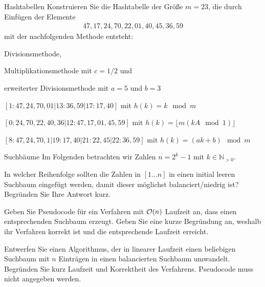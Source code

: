 \documentclass{article}
\begin{document}
\begin{eexercises}{Hashtabellen}{
    Konstruieren Sie die Hashtabelle der Größe $m = 23$, die durch Einfügen der Elemente
    \begin{align*}47, 17, 24, 70, 22, 01, 40, 45, 36, 59\end{align*}
    mit der nachfolgenden Methode entsteht:
  }
  \item Divisionsmethode,
  \item Multiplikationsmethode mit $c = 1/2$ und
  \item erweiterter Divisionsmethode mit $a = 5$ und $b = 3$
\end{eexercises}

\begin{solutions}
  \item $[1: 47,24,70,01|13: 36,59|17: 17,40]$ mit $h(k) = k \mod m$
  \item $[0: 24,70,22,40,36|12:47,17,01,45,59]$ mit $h(k) = \lfloor m(kA \mod 1) \rfloor$
  \item $[8: 47,24,70,1|19: 17,40|21: 22,45|22: 36,59]$ mit $h(k) = (ak+b) \mod m$
\end{solutions}

\begin{eexercises}{Suchbäume}{
    Im Folgenden betrachten wir Zahlen $n = 2^k - 1$ mit $k \in \mathbb{N}_{>0}$.
  }
  \item In welcher Reihenfolge sollten die Zahlen in $[1\dots n]$ in einen initial leeren Suchbaum eingefügt werden, damit dieser möglichst balanciert/niedrig ist? Begründen Sie Ihre Antwort kurz.
  \item\label{suchbäume:2} Geben Sie Pseudocode für ein Verfahren mit $\mathcal{O}(n)$ Laufzeit an, dass einen entsprechenden Suchbaum erzeugt. Geben Sie eine kurze Begründung an, weshalb ihr Verfahren korrekt ist und die entsprechende Laufzeit erreicht.
  \item Entwerfen Sie einen Algorithmus, der in linearer Laufzeit einen beliebigen Suchbaum mit $n$ Einträgen in einen balancierten Suchbaum umwandelt. Begründen Sie kurz Laufzeit und Korrektheit des Verfahrens. Pseudocode muss nicht angegeben werden.
\end{eexercises}
\end{document}
